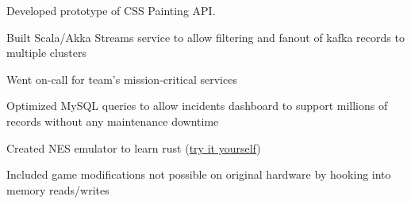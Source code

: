 \documentclass[12pt]{jmichaud-resume}
\begin{document}
\begin{minipage}[t]{0.64\textwidth}
\begin{tightemize}
	\item Developed prototype of CSS Painting API.
\end{tightemize}
\sectionsep
{} \hfill {}


\begin{tightemize}
	\item Built Scala/Akka Streams service to allow filtering and fanout of kafka records to multiple clusters
	\item Went on-call for team's mission-critical services
	
\end{tightemize}
\sectionsep
{}\hfill {}

\vspace{3pt}

\begin{tightemize}
	\item Optimized MySQL queries to allow incidents dashboard to support millions of records without any maintenance downtime
\end{tightemize}
\sectionsep

 \hfill {}

\sectionsep

 \hfill {}



\sectionsep

 \hfill
{}
\begin{tightemize}
	\item Created NES emulator to learn rust (\href{http://justinmichaud.com}{try it yourself})
	\item Included game modifications not possible on original hardware by hooking into memory reads/writes
\end{tightemize}


\end{minipage}
\end{document}
